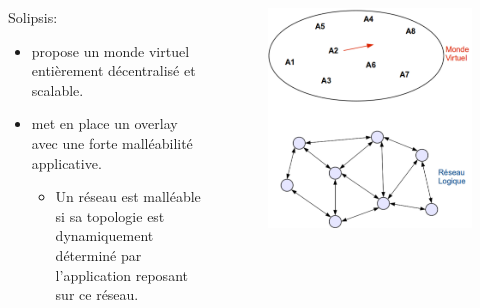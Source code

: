 \documentclass{beamer}
\begin{document}
  \begin{frame}
	\begin{columns}
          \begin{column}{6cm}
	Solipsis:\\
	\begin{itemize}
		\item propose un monde virtuel entièrement décentralisé et scalable.\\
		\item met en place un overlay avec une forte malléabilité applicative.\\
		\tiny{
			\begin{itemize}
				\item Un réseau est malléable si sa topologie est dynamiquement déterminé par l'application reposant sur ce réseau.\\
			\end{itemize}
		}
	\end{itemize}
	\end{column}
        \begin{column}{4cm}
        \begin{figure}
        \includegraphics[scale=0.1]{./Ressources/Images/OverlayMalle_et1.png}\\

\end{figure}
\end{column}
\end{columns}
\end{frame}
\end{document}
